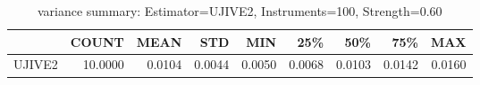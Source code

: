 \begin{table}[ht]
\centering
\caption{variance summary: Estimator=UJIVE2, Instruments=100, Strength=0.60}
\begin{tabular}{lrrrrrrrr}
\toprule
 & COUNT & MEAN & STD & MIN & 25\% & 50\% & 75\% & MAX \\
\midrule
UJIVE2 & 10.0000 & 0.0104 & 0.0044 & 0.0050 & 0.0068 & 0.0103 & 0.0142 & 0.0160 \\
\bottomrule
\end{tabular}
\end{table}
